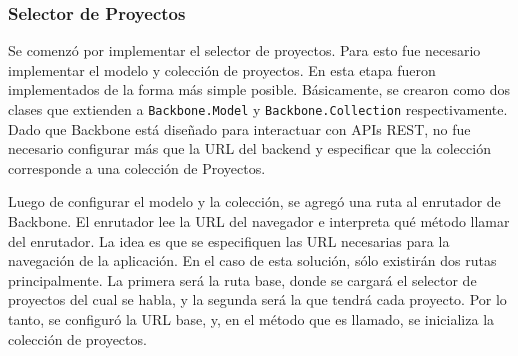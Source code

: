 \documentclass[12pt,spanish,letter]{report}
\newenvironment{Shaded}{}{}
\newcommand{\KeywordTok}[1]{\textcolor[rgb]{0.00,0.44,0.13}{\textbf{{#1}}}}
\newcommand{\DataTypeTok}[1]{\textcolor[rgb]{0.56,0.13,0.00}{{#1}}}
\newcommand{\CharTok}[1]{\textcolor[rgb]{0.25,0.44,0.63}{{#1}}}
\newcommand{\StringTok}[1]{\textcolor[rgb]{0.25,0.44,0.63}{{#1}}}
\newcommand{\CommentTok}[1]{\textcolor[rgb]{0.38,0.63,0.69}{\textit{{#1}}}}
\newcommand{\OtherTok}[1]{\textcolor[rgb]{0.00,0.44,0.13}{{#1}}}
\newcommand{\FunctionTok}[1]{\textcolor[rgb]{0.02,0.16,0.49}{{#1}}}
\newcommand{\NormalTok}[1]{{#1}}
\begin{document}
\subsubsection{Selector de Proyectos}

Se comenzó por implementar el selector de proyectos. Para esto fue
necesario implementar el modelo y colección de proyectos. En esta etapa
fueron implementados de la forma más simple posible. Básicamente, se
crearon como dos clases que extienden a \texttt{Backbone.Model} y
\texttt{Backbone.Collection} respectivamente. Dado que Backbone está
diseñado para interactuar con APIs REST, no fue necesario configurar más
que la URL del backend y especificar que la colección corresponde a una
colección de Proyectos.

Luego de configurar el modelo y la colección, se agregó una ruta al
enrutador de Backbone. El enrutador lee la URL del navegador e
interpreta qué método llamar del enrutador. La idea es que se
especifiquen las URL necesarias para la navegación de la aplicación. En
el caso de esta solución, sólo existirán dos rutas principalmente. La
primera será la ruta base, donde se cargará el selector de proyectos del
cual se habla, y la segunda será la que tendrá cada proyecto. Por lo
tanto, se configuró la URL base, y, en el método que es llamado, se
inicializa la colección de proyectos.

\begin{Shaded}
\end{Shaded}
\end{document}
